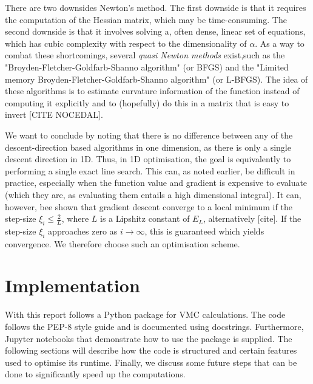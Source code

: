 \documentclass[11pt,a4paper]{article}
\numberwithin{equation}{section}
\begin{document}
There are two downsides Newton's method. The first downside is that it requires the computation of the Hessian matrix, which may be time-consuming. The second downside is that it involves solving a, often dense, linear set of equations, which has cubic complexity with respect to the dimensionality of $\alpha$. As a way to combat these shortcomings, several \emph{quasi Newton methods} exist,such as the "Broyden-Fletcher-Goldfarb-Shanno algorithm" (or BFGS) and the "Limited memory Broyden-Fletcher-Goldfarb-Shanno algorithm" (or L-BFGS). The idea of these algorithms is to estimate curvature information of the function instead of computing it explicitly and to (hopefully) do this in a matrix that is easy to invert [CITE NOCEDAL].

We want to conclude by noting that there is no difference between any of the descent-direction based algorithms in one dimension, as there is only a single descent direction in 1D. Thus, in 1D optimisation, the goal is equivalently to performing a single exact line search. This can, as noted earlier, be difficult in practice, especially when the function value and gradient is expensive to evaluate (which they are, as evaluating them entails a high dimensional integral). It can, however, bee shown that gradient descent converge to a local minimum if the step-size $\xi_i \leq \frac{2}{L}$, where $L$ is a Lipshitz constant of $E_L$, alternatively [cite]. If the step-size $\xi_i$ approaches zero as $i \to \infty$, this is guaranteed which yields convergence. We therefore choose such an optimisation scheme.

\section{Implementation}
With this report follows a Python package for VMC calculations. The code follows the PEP-8 style guide and is documented using docstrings. Furthermore, Jupyter notebooks that demonstrate how to use the package is supplied. The following sections will describe how the code is structured and certain features used to optimise its runtime. Finally, we discuss some future steps that can be done to significantly speed up the computations.
\end{document}
